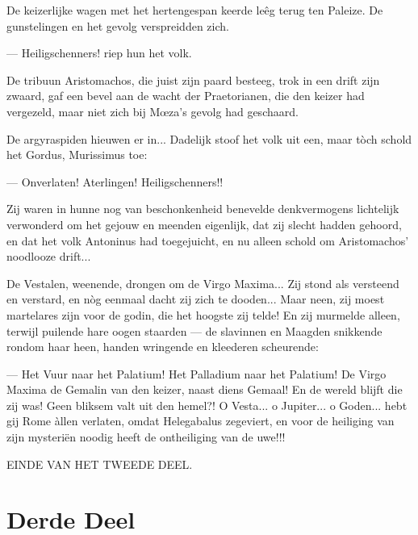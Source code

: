 \documentclass[a4paper, 12pt, oneside, dutch]{article}
\begin{document}
De keizerlijke wagen met het hertengespan keerde leêg terug ten Paleize. De gunstelingen en het gevolg verspreidden zich.

--- Heiligschenners! riep hun het volk.

De tribuun Aristomachos, die juist zijn paard besteeg, trok in een drift zijn zwaard, gaf een bevel aan de wacht der Praetorianen, die den keizer had vergezeld, maar niet zich bij Mœza's gevolg had geschaard.

De argyraspiden hieuwen er in... Dadelijk stoof het volk uit een, maar tòch schold het Gordus, Murissimus toe:

--- Onverlaten! Aterlingen! Heiligschenners!!

Zij waren in hunne nog van beschonkenheid benevelde denkvermogens lichtelijk verwonderd om het gejouw en meenden eigenlijk, dat zij slecht hadden gehoord, en dat het volk Antoninus had toegejuicht, en nu alleen schold om Aristomachos' noodlooze drift...

De Vestalen, weenende, drongen om de Virgo Maxima... Zij stond als versteend en verstard, en nòg eenmaal dacht zij zich te dooden... Maar neen, zij moest martelares zijn voor de godin, die het hoogste zij telde! En zij murmelde alleen, terwijl puilende hare oogen staarden --- de slavinnen en Maagden snikkende rondom haar heen, handen wringende en kleederen scheurende:

--- Het Vuur naar het Palatium! Het Palladium naar het Palatium! De Virgo Maxima de Gemalin van den keizer, naast diens Gemaal! En de wereld blijft die zij was! Geen bliksem valt uit den hemel?! O Vesta... o Jupiter... o Goden... hebt gij Rome àllen verlaten, omdat Helegabalus zegeviert, en voor de heiliging van zijn mysteriën noodig heeft de ontheiliging van de uwe!!!

EINDE VAN HET TWEEDE DEEL.
\clearpage
\section{Derde Deel}
\subsection{}
\end{document}
